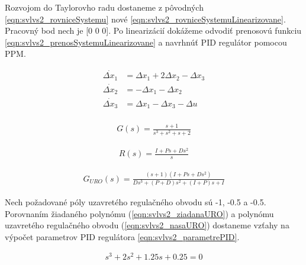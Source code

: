 \documentclass[../main.tex]{subfiles}
\begin{document}
Rozvojom do Taylorovho radu dostaneme z pôvodných \cref{eqn:svlvs2_rovniceSystemu} nové \cref{eqn:svlvs2_rovniceSystemuLinearizovane}. Pracovný bod nech je [0 0 0]. Po linearizácií dokážeme odvodiť prenosovú funkciu \cref{eqn:svlvs2_prenosSystemuLinearizovane} a navrhnúť PID regulátor pomocou PPM.

\begin{equation}
		\begin{aligned}
		\dot{\Delta x_1} &= \Delta x_1 + 2\Delta x_2 - \Delta x_3 			\\	
		\dot{\Delta x_2} &= - \Delta x_1 - \Delta x_2 					\\
		\dot{\Delta x_3} &=  \Delta x_1 - \Delta x_3 - \Delta u 				\\
		\end{aligned}
		\label{eqn:svlvs2_rovniceSystemuLinearizovane}
\end{equation}

\begin{equation}
		\begin{aligned}
		G(s) = \frac{s+1}{s^3+s^2+s+2}
		\end{aligned}
		\label{eqn:svlvs2_prenosSystemuLinearizovane}
\end{equation}

\begin{equation}
		\begin{aligned}
		R(s) = \frac{I + Ps + Ds^2}{s}
		\end{aligned}
		\label{eqn:svlvs2_prenosRegulatoraPID}
\end{equation}

\begin{equation}
		\begin{aligned}
		G_{URO}(s) = \frac{(s+1)(I + Ps + Ds^2)}{Ds^3+(P+D)s^2+(I+P)s+I}
		\end{aligned}
		\label{eqn:svlvs2_prenosUROSystemuLinearizovane}
\end{equation}

Nech požadované póly uzavretého regulačného obvodu sú -1, -0.5 a -0.5. Porovnaním žiadaného polynómu (\cref{eqn:svlvs2_ziadanaURO}) a polynómu uzavretého regulačného obvodu (\cref{eqn:svlvs2_nasaURO}) dostaneme vzťahy na výpočet parametrov PID regulátora \cref{eqn:svlvs2_parametrePID}.

\begin{equation}
		\begin{aligned}
		s^3+2s^2+1.25s+0.25=0
		\end{aligned}
		\label{eqn:svlvs2_ziadanaURO}
	\end{equation}
\end{document}

